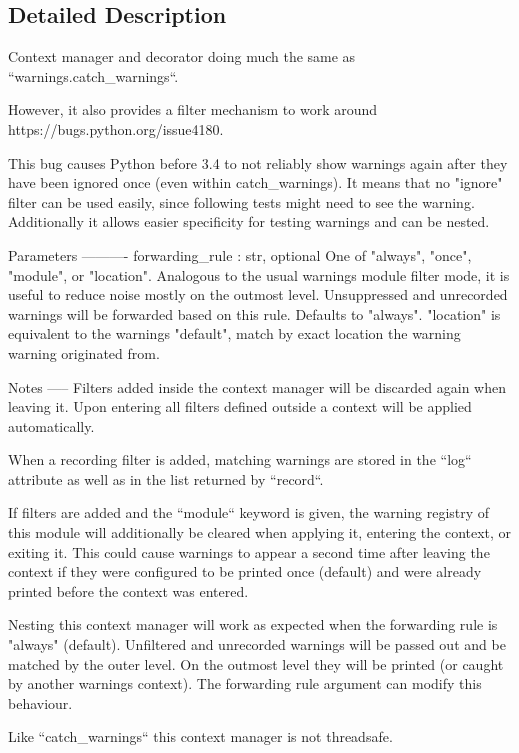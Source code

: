 \subsection{Detailed Description}
\begin{DoxyVerb}Context manager and decorator doing much the same as
``warnings.catch_warnings``.

However, it also provides a filter mechanism to work around
https://bugs.python.org/issue4180.

This bug causes Python before 3.4 to not reliably show warnings again
after they have been ignored once (even within catch_warnings). It
means that no "ignore" filter can be used easily, since following
tests might need to see the warning. Additionally it allows easier
specificity for testing warnings and can be nested.

Parameters
----------
forwarding_rule : str, optional
    One of "always", "once", "module", or "location". Analogous to
    the usual warnings module filter mode, it is useful to reduce
    noise mostly on the outmost level. Unsuppressed and unrecorded
    warnings will be forwarded based on this rule. Defaults to "always".
    "location" is equivalent to the warnings "default", match by exact
    location the warning warning originated from.

Notes
-----
Filters added inside the context manager will be discarded again
when leaving it. Upon entering all filters defined outside a
context will be applied automatically.

When a recording filter is added, matching warnings are stored in the
``log`` attribute as well as in the list returned by ``record``.

If filters are added and the ``module`` keyword is given, the
warning registry of this module will additionally be cleared when
applying it, entering the context, or exiting it. This could cause
warnings to appear a second time after leaving the context if they
were configured to be printed once (default) and were already
printed before the context was entered.

Nesting this context manager will work as expected when the
forwarding rule is "always" (default). Unfiltered and unrecorded
warnings will be passed out and be matched by the outer level.
On the outmost level they will be printed (or caught by another
warnings context). The forwarding rule argument can modify this
behaviour.

Like ``catch_warnings`` this context manager is not threadsafe.


\end{DoxyVerb}
